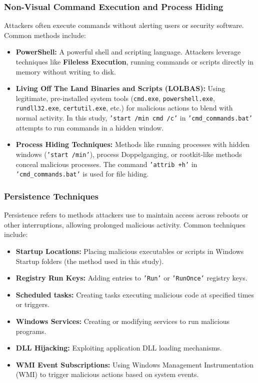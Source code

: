 \documentclass[11pt]{article}
\begin{document}
	\subsubsection{Non-Visual Command Execution and Process Hiding}
	Attackers often execute commands without alerting users or security software. Common methods include:
	\begin{itemize}
		\item \textbf{PowerShell:} A powerful shell and scripting language. Attackers leverage techniques like \textbf{Fileless Execution}, running commands or scripts directly in memory without writing to disk.
		\item \textbf{Living Off The Land Binaries and Scripts (LOLBAS):} Using legitimate, pre-installed system tools (\texttt{cmd.exe}, \texttt{powershell.exe}, \texttt{rundll32.exe}, \texttt{certutil.exe}, etc.) for malicious actions to blend with normal activity. In this study, \texttt{'start /min cmd /c'} in \texttt{'cmd\_commands.bat'} attempts to run commands in a hidden window.
		\item \textbf{Process Hiding Techniques:} Methods like running processes with hidden windows (\texttt{'start /min'}), process Doppelganging, or rootkit-like methods conceal malicious processes. The command \texttt{'attrib +h'} in \texttt{'cmd\_commands.bat'} is used for file hiding.
	\end{itemize}
	
	\subsubsection{Persistence Techniques}
	Persistence refers to methods attackers use to maintain access across reboots or other interruptions, allowing prolonged malicious activity. Common techniques include:
	\begin{itemize}
		\item \textbf{Startup Locations:} Placing malicious executables or scripts in Windows Startup folders (the method used in this study).
		\item \textbf{Registry Run Keys:} Adding entries to \texttt{'Run'} or \texttt{'RunOnce'} registry keys.
		\item \textbf{Scheduled tasks:} Creating tasks executing malicious code at specified times or triggers.
		\item \textbf{Windows Services:} Creating or modifying services to run malicious programs.
		\item \textbf{DLL Hijacking:} Exploiting application DLL loading mechanisms.
		\item \textbf{WMI Event Subscriptions:} Using Windows Management Instrumentation (WMI) to trigger malicious actions based on system events.
	\end{itemize}
	
\end{document}
